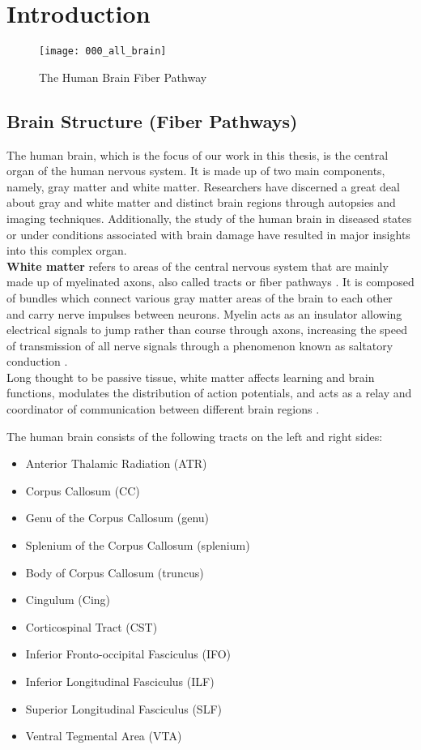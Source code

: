 \documentclass[../structure.tex]{subfiles}
\begin{document}
\chapter{Introduction}

\begin{figure}[h!]
\centering
\texttt{[image: 000\_all\_brain]}
\captionsetup{justification=centering}
\caption{The Human Brain Fiber Pathway}
\label{fig:all_brain}
\end{figure}

\section{Brain Structure (Fiber Pathways)}
	The human brain, which is the focus of our work in this thesis, is the central organ of the human nervous system. It is made up of two main components, namely, gray matter and white matter. Researchers have discerned a great deal about gray and white matter and distinct brain regions through autopsies and imaging techniques. Additionally, the study of the human brain in diseased states or under conditions associated with brain damage have resulted in major insights into this complex organ.
	\\\textbf{White matter}  refers to areas of the central nervous system that are mainly made up of myelinated axons, also called tracts or fiber pathways \cite{Blumenfeld2010}. It is composed of bundles which connect various gray matter areas of the brain to each other and carry nerve impulses between neurons. Myelin acts as an insulator allowing electrical signals to jump rather than course through axons, increasing the speed of transmission of all nerve signals through a phenomenon known as saltatory conduction \cite{Klein2008}.
	\\Long thought to be passive tissue, white matter affects learning and brain functions, modulates the distribution of action potentials, and acts as a relay and coordinator of communication between different brain regions \cite{Fields2008}.
	
	The human brain consists of the following tracts on the left and right sides:
   \begin{itemize}
       \item Anterior Thalamic Radiation (ATR)
       \item Corpus Callosum (CC)
       \item Genu of the Corpus Callosum (genu)
       \item Splenium of the Corpus Callosum (splenium)
       \item Body of Corpus Callosum (truncus)

		\item Cingulum (Cing)
		\item Corticospinal Tract (CST)
		\item Inferior Fronto-occipital Fasciculus (IFO)
		\item Inferior Longitudinal Fasciculus (ILF)
		\item Superior Longitudinal Fasciculus (SLF)
		\item Ventral Tegmental Area (VTA)
	\end{itemize}
\end{document}

